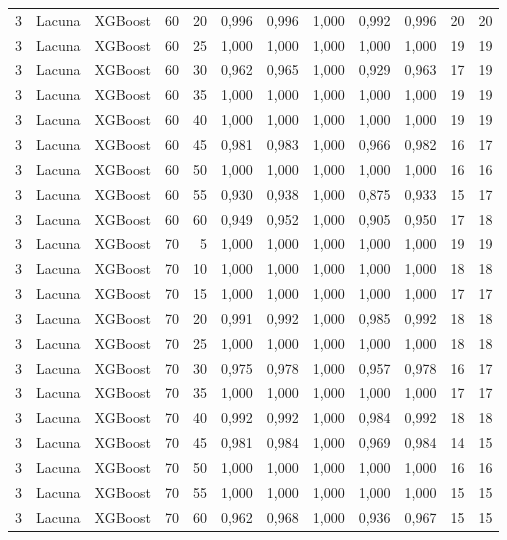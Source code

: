 \begin{longtable}{@{}rllrrrrrrrrr@{}}
3 & Lacuna & XGBoost & 60 & 20 & 0,996 & 0,996 & 1,000 & 0,992 & 0,996 & 20 & 20 \\
3 & Lacuna & XGBoost & 60 & 25 & 1,000 & 1,000 & 1,000 & 1,000 & 1,000 & 19 & 19 \\
3 & Lacuna & XGBoost & 60 & 30 & 0,962 & 0,965 & 1,000 & 0,929 & 0,963 & 17 & 19 \\
3 & Lacuna & XGBoost & 60 & 35 & 1,000 & 1,000 & 1,000 & 1,000 & 1,000 & 19 & 19 \\
3 & Lacuna & XGBoost & 60 & 40 & 1,000 & 1,000 & 1,000 & 1,000 & 1,000 & 19 & 19 \\
3 & Lacuna & XGBoost & 60 & 45 & 0,981 & 0,983 & 1,000 & 0,966 & 0,982 & 16 & 17 \\
3 & Lacuna & XGBoost & 60 & 50 & 1,000 & 1,000 & 1,000 & 1,000 & 1,000 & 16 & 16 \\
3 & Lacuna & XGBoost & 60 & 55 & 0,930 & 0,938 & 1,000 & 0,875 & 0,933 & 15 & 17 \\
3 & Lacuna & XGBoost & 60 & 60 & 0,949 & 0,952 & 1,000 & 0,905 & 0,950 & 17 & 18 \\
3 & Lacuna & XGBoost & 70 & 5 & 1,000 & 1,000 & 1,000 & 1,000 & 1,000 & 19 & 19 \\
3 & Lacuna & XGBoost & 70 & 10 & 1,000 & 1,000 & 1,000 & 1,000 & 1,000 & 18 & 18 \\
3 & Lacuna & XGBoost & 70 & 15 & 1,000 & 1,000 & 1,000 & 1,000 & 1,000 & 17 & 17 \\
3 & Lacuna & XGBoost & 70 & 20 & 0,991 & 0,992 & 1,000 & 0,985 & 0,992 & 18 & 18 \\
3 & Lacuna & XGBoost & 70 & 25 & 1,000 & 1,000 & 1,000 & 1,000 & 1,000 & 18 & 18 \\
3 & Lacuna & XGBoost & 70 & 30 & 0,975 & 0,978 & 1,000 & 0,957 & 0,978 & 16 & 17 \\
3 & Lacuna & XGBoost & 70 & 35 & 1,000 & 1,000 & 1,000 & 1,000 & 1,000 & 17 & 17 \\
3 & Lacuna & XGBoost & 70 & 40 & 0,992 & 0,992 & 1,000 & 0,984 & 0,992 & 18 & 18 \\
3 & Lacuna & XGBoost & 70 & 45 & 0,981 & 0,984 & 1,000 & 0,969 & 0,984 & 14 & 15 \\
3 & Lacuna & XGBoost & 70 & 50 & 1,000 & 1,000 & 1,000 & 1,000 & 1,000 & 16 & 16 \\
3 & Lacuna & XGBoost & 70 & 55 & 1,000 & 1,000 & 1,000 & 1,000 & 1,000 & 15 & 15 \\
3 & Lacuna & XGBoost & 70 & 60 & 0,962 & 0,968 & 1,000 & 0,936 & 0,967 & 15 & 15 \\

\end{longtable}
